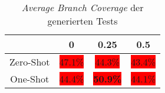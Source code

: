 \bgroup
\def\arraystretch{2}
\begin{table}[H]
	\vspace{.5cm}
	\centering		
	\begin{center}
		\begin{tabular}{|c||c|c|c|}
			\hline 
			& 0 & 0.25 & 0.5 \\
			\hline 
			\hline
			Zero-Shot & \colorbox{red}{47.1\%} & \colorbox{red}{44.3\%} & \colorbox{red}{43.4\%} \\
			\hline
			One-Shot & \colorbox{red}{44.4\%} & \colorbox{red}{\textbf{50.9\%}} & \colorbox{red}{44.1\%} \\
			\hline
		\end{tabular} 
	\end{center}
	\caption{\textit{Average Branch Coverage} der generierten Tests}
	\label{fig:branch-avg}
	\vspace{-.8cm}
\end{table}
\egroup
